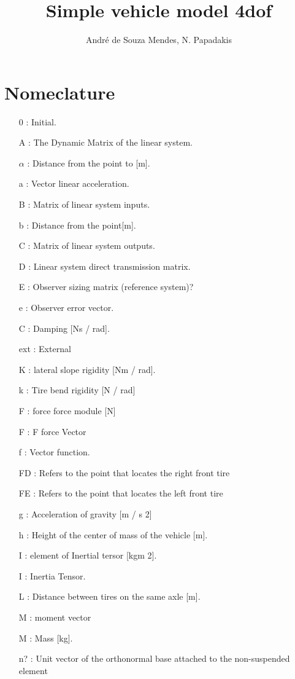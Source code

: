 \documentclass[sublist,a4paper,twoside,11pt]{article}
\author{André de Souza Mendes, N. Papadakis}
\title{Simple vehicle model 4dof }
\begin{document}
\maketitle
\tableofcontents
\section*{Nomeclature}

\begin{itemize}
\item [0]: Initial.
\item [A]: The Dynamic Matrix of the linear system.
\item [$\alpha$]: Distance from the point to [m].
\item [a]: Vector linear acceleration.
\item [B]: Matrix of linear system inputs.
\item [b]: Distance from the point[m].
\item [C]: Matrix of linear system outputs.
\item [D]: Linear system direct transmission matrix.
\item [E]: Observer sizing matrix (reference system)?
\item [e]: Observer error vector.
\item [C]: Damping [Ns / rad].
\item [ext]: External
\item [K]: lateral slope rigidity [Nm / rad].
\item [k]: Tire bend rigidity [N / rad]
\item [F]: force force module [N]
\item [F]: F force Vector
\item [f ]: Vector function.
\item [FD]: Refers to the point that locates the right front tire
\item [FE]: Refers to the point that locates the left front tire
\item [g]: Acceleration of gravity [m / s 2]
\item [h]: Height of the center of mass of the vehicle [m].
\item [I]: element of Inertial tersor [kgm 2].
\item [I]: Inertia Tensor.
\item [L]: Distance between tires on the same axle [m].
\item [M]: moment vector 
\item [M]: Mass [kg].
\item [n?]: Unit vector of the orthonormal base attached to the non-suspended element

\end{itemize}
\end{document}
